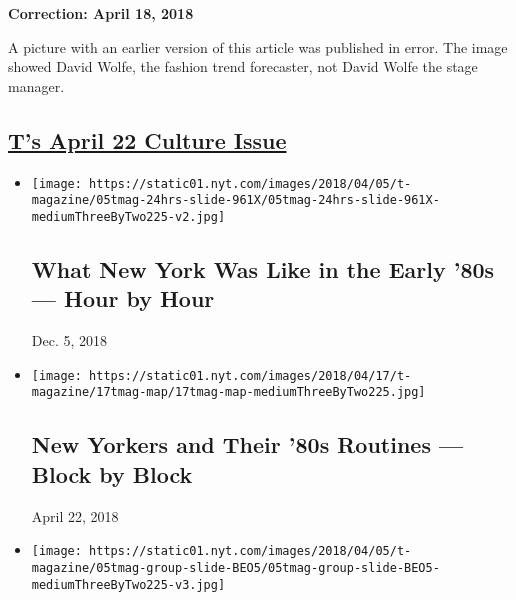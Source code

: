 \textbf{Correction: April 18, 2018}

A picture with an earlier version of this article was published in
error. The image showed David Wolfe, the fashion trend forecaster, not
David Wolfe the stage manager.

\hypertarget{ts-april-22-culture-issue}{%
\subsection{\texorpdfstring{\href{https://www.nytimes.com/issue/t-magazine/2018/04/06/ts-april-22-culture-issue}{T's
April 22 Culture
Issue}}{T's April 22 Culture Issue}}\label{ts-april-22-culture-issue}}

\begin{itemize}
\item
  \href{https://www.nytimes.com/2018/04/17/t-magazine/24-hours-new-york-city-1980s-life.html}{}

  \texttt{[image: https://static01.nyt.com/images/2018/04/05/t-magazine/05tmag-24hrs-slide-961X/05tmag-24hrs-slide-961X-mediumThreeByTwo225-v2.jpg]}

  \hypertarget{what-new-york-was-like-in-the-early-80s--hour-by-hour}{%
  \subsection{What New York Was Like in the Early '80s --- Hour by
  Hour}\label{what-new-york-was-like-in-the-early-80s--hour-by-hour}}

  Dec. 5, 2018
\item
  \href{https://www.nytimes.com/2018/04/17/t-magazine/80s-nyc-map.html}{}

  \texttt{[image: https://static01.nyt.com/images/2018/04/17/t-magazine/17tmag-map/17tmag-map-mediumThreeByTwo225.jpg]}

  \hypertarget{new-yorkers-and-their-80s-routines--block-by-block}{%
  \subsection{New Yorkers and Their '80s Routines --- Block by
  Block}\label{new-yorkers-and-their-80s-routines--block-by-block}}

  April 22, 2018
\item
  \href{https://www.nytimes.com/2018/04/17/t-magazine/new-york-1980s-kids-gaby-hoffmann-zoe-jackson.html}{}

  \texttt{[image: https://static01.nyt.com/images/2018/04/05/t-magazine/05tmag-group-slide-BEO5/05tmag-group-slide-BEO5-mediumThreeByTwo225-v3.jpg]}


\end{itemize}
